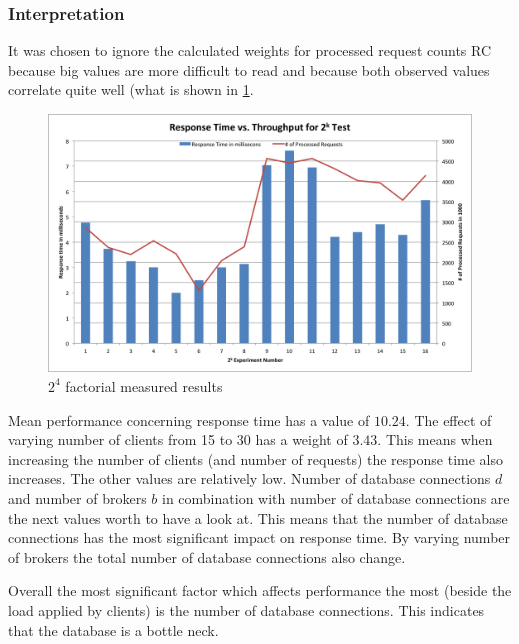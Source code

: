 \documentclass[milestone1.tex]{subfiles}
\begin{document}
\subsubsection{Interpretation}
It was chosen to ignore the calculated weights for processed request counts RC because big values are more difficult to read and because both observed values correlate quite well (what is shown in \ref{fig:2kmeasuredresults}.


\begin{figure}[H]
	\begin{center}
    \includegraphics[scale=0.55]{../drawings/2k-factorial-plot.png}
  \end{center}
  \caption{$2^4$ factorial measured results}
  \label{fig:2kmeasuredresults}
\end{figure}



Mean performance concerning response time has a value of $10.24$. The effect of varying number of clients from 15 to 30 has a weight of $3.43$. This means when increasing the number of clients (and number of requests) the response time also increases. The other values are relatively low. Number of database connections $d$ and number of brokers $b$ in combination with number of database connections  are the next values worth to have a look at. This means that the number of database connections has the most significant impact on response time. By varying number of brokers the total number of database connections also change.

Overall the most significant factor which affects performance the most (beside the load applied by clients) is the number of database connections. This indicates that the database is a bottle neck.
\end{document}
